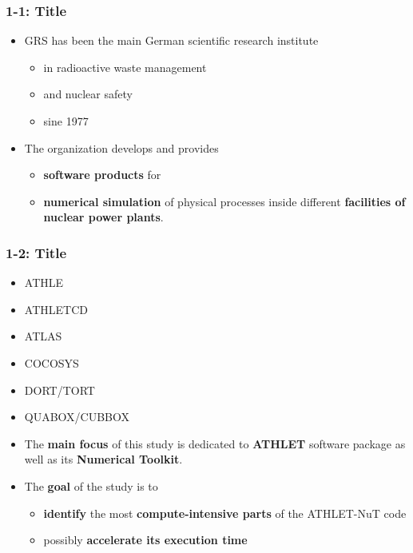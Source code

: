 \begin{frame}[t]
\frametitle{1-1: Title}

\begin{itemize}
    \item GRS has been the main German scientific research institute 
    
    \begin{itemize}
        \item in radioactive waste management
        \item and nuclear safety
        \item sine 1977
    \end{itemize}
    

    \item The organization develops and provides 
    \begin{itemize}
        \item \textbf{software products} for 
        \item \textbf{numerical simulation} of physical processes inside different \textbf{facilities of nuclear power plants}.\\
    \end{itemize}
\end{itemize}

\end{frame}


\begin{frame}[t]
\frametitle{1-2: Title}
\justifying


\begin{itemize}
    \item ATHLE
    \item ATHLET\-CD 
    \item ATLAS
    \item COCOSYS
    \item DORT/TORT 
    \item QUABOX/CUBBOX

    \setlength\itemsep{0.5cm}
    \item The \textbf{main focus} of this study is dedicated to \textbf{ATHLET} software package as well as its \textbf{Numerical Toolkit}. 
    
    \item The \textbf{goal} of the study is to 
        \begin{itemize}
        \setlength\itemsep{0.5cm}
            \item \textbf{identify} the most \textbf{compute-intensive parts} of the ATHLET-NuT code 
            
            \item possibly \textbf{accelerate its execution time}\\
        \end{itemize}
\end{itemize}
\end{frame}
